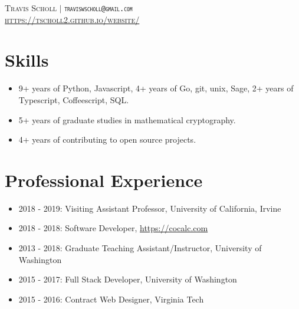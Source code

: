 \documentclass{article}
\begin{document}
	\vspace*{-1.5in}

	\begin{center}
	\textsc{
		Travis Scholl $\vert$ {\tt traviswscholl@gmail.com} \\ \url{https://tscholl2.github.io/website/}
	}
	\end{center}



	\section{Skills}

	\begin{itemize}
		\item 9+ years of Python, Javascript, 4+ years of Go, git, unix, Sage, 2+ years of Typescript, Coffeescript, SQL.
		\item 5+ years of graduate studies in mathematical cryptography.
		\item 4+ years of contributing to open source projects.
	\end{itemize}

	\section{Professional Experience}

	\begin{itemize}
		\item 2018 - 2019: Visiting Assistant Professor, University of California, Irvine
		\item 2018 - 2018: Software Developer, \url{https://cocalc.com}
		\item 2013 - 2018: Graduate Teaching Assistant/Instructor, University of Washington
		\item 2015 - 2017: Full Stack Developer, University of Washington
		\item 2015 - 2016: Contract Web Designer, Virginia Tech
	\end{itemize}
\end{document}

